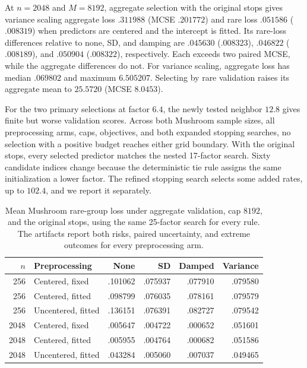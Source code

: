 At $n = 2048$ and $M = 8192$, aggregate selection with the original stops
gives variance scaling aggregate loss $.311988$ (MCSE $.201772$) and rare
loss $.051586$ ($.008319$) when predictors are centered and the intercept is
fitted. Its rare-loss differences relative to none, SD, and damping are
$.045630$ ($.008323$), $.046822$ ($.008189$), and $.050904$ ($.008322$),
respectively. Each exceeds two paired MCSE, while the aggregate differences do
not. For variance scaling, aggregate loss has median $.069802$ and maximum
$6.505207$. Selecting by rare validation raises its aggregate mean to $25.5720$
(MCSE $8.0453$).

For the two primary selections at factor $6.4$, the newly tested neighbor
$12.8$ gives finite but worse validation scores. Across both Mushroom sample
sizes, all preprocessing arms, caps, objectives, and both expanded stopping
searches, no selection with a positive budget reaches either grid boundary.
With the original stops, every selected predictor matches the nested 17-factor
search. Sixty candidate indices change because the deterministic tie rule
assigns the same initialization a lower factor. The refined stopping search
selects some added rates, up to $102.4$, and we report it separately.

\begin{table}[ht]
  \centering
  \begin{tabular}{rlrrrr}
    \toprule
     $n$ & Preprocessing      &    None &      SD &  Damped & Variance \\
    \midrule
     256 & Centered, fixed    & .101062 & .075937 & .077910 &  .079580 \\
     256 & Centered, fitted   & .098799 & .076035 & .078161 &  .079579 \\
     256 & Uncentered, fitted & .136151 & .076391 & .082727 &  .079542 \\
    2048 & Centered, fixed    & .005647 & .004722 & .000652 &  .051601 \\
    2048 & Centered, fitted   & .005955 & .004764 & .000682 &  .051586 \\
    2048 & Uncentered, fitted & .043284 & .005060 & .007037 &  .049465 \\
    \bottomrule
  \end{tabular}
  \caption{
    Mean Mushroom rare-group loss under aggregate validation, cap $8192$, and
    the original stops, using the same 25-factor search for every rule. The
    artifacts report both risks, paired uncertainty, and extreme outcomes for
    every preprocessing arm.
  }
\end{table}

